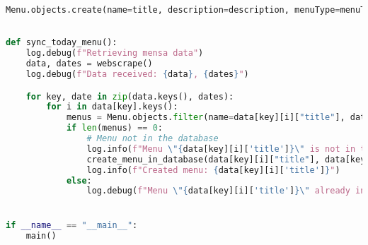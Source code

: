 \begin{lstlisting}[language=Python]
    Menu.objects.create(name=title, description=description, menuType=menuType, date=date, **labels[label])
    

def sync_today_menu():
    log.debug(f"Retrieving mensa data")
    data, dates = webscrape()
    log.debug(f"Data received: {data}, {dates}")

    for key, date in zip(data.keys(), dates):
        for i in data[key].keys():
            menus = Menu.objects.filter(name=data[key][i]["title"], date=date)
            if len(menus) == 0:
                # Menu not in the database
                log.info(f"Menu \"{data[key][i]['title']}\" is not in the database")
                create_menu_in_database(data[key][i]["title"], data[key][i]["description"], data[key][i]["label"], date)  # Create the menu
                log.info(f"Created menu: {data[key][i]['title']}")
            else:
                log.debug(f"Menu \"{data[key][i]['title']}\" already in database")


if __name__ == "__main__":
    main()
\end{lstlisting}
